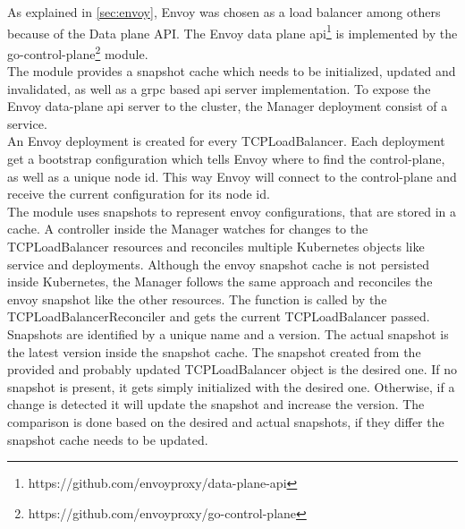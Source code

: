 As explained in \autoref{sec:envoy}, Envoy was chosen as a load balancer among others because of the Data plane API.
The Envoy data plane api\footnote{https://github.com/envoyproxy/data-plane-api} is implemented by the go-control-plane\footnote{https://github.com/envoyproxy/go-control-plane} module.
\\
The module provides a snapshot cache which needs to be initialized, updated and invalidated, as well as a grpc based api server implementation.
To expose the Envoy data-plane api server to the cluster, the Manager deployment consist of a service.
\\
An Envoy deployment is created for every TCPLoadBalancer.
Each deployment get a bootstrap configuration which tells Envoy where to find the control-plane, as well as a unique node id.
This way Envoy will connect to the control-plane and receive the current configuration for its node id.
\\
The module uses snapshots to represent envoy configurations, that are stored in a cache.
A controller inside the Manager watches for changes to the TCPLoadBalancer resources and reconciles multiple Kubernetes objects like service and deployments.
Although the envoy snapshot cache is not persisted inside Kubernetes, the Manager follows the same approach and reconciles the envoy snapshot like the other resources.
The function is called by the TCPLoadBalancerReconciler and gets the current TCPLoadBalancer passed.
Snapshots are identified by a unique name and a version.
The actual snapshot is the latest version inside the snapshot cache.
The snapshot created from the provided and probably updated TCPLoadBalancer object is the desired one.
If no snapshot is present, it gets simply initialized with the desired one.
Otherwise, if a change is detected it will update the snapshot and increase the version.
The comparison is done based on the desired and actual snapshots, if they differ the snapshot cache needs to be updated.
\\

